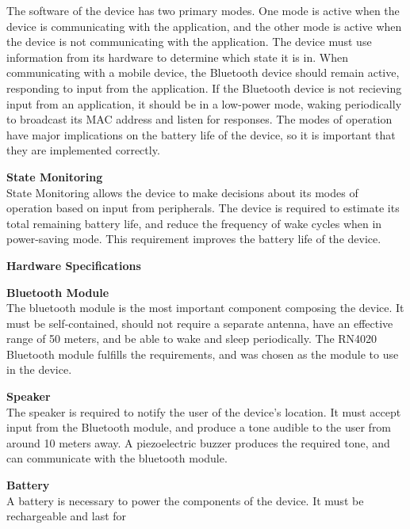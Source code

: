 \documentclass[12pt]{article}
\begin{document}
\begin{packed_enum}
\begin{packed_enum}
\begin{packed_enum}
        The software of the device has two primary modes. One mode is active when the device is communicating 
        with the application, and the other mode is active when the device is not communicating with the
        application. The device must use information from its hardware to determine which state it is in. When
        communicating with a mobile device, the Bluetooth device should remain active, responding to input from
        the application. If the Bluetooth device is not recieving input from an application, it should be in a 
        low-power mode, waking periodically to broadcast its MAC address and listen for responses. The modes of
        operation have major implications on the battery life of the device, so it is important that they are
        implemented correctly.
        \item \textbf{State Monitoring} \\
        State Monitoring allows the device to make decisions about its modes of operation based on input from
        peripherals. The device is required to estimate its total remaining battery life, and reduce the
        frequency of wake cycles when in power-saving mode. This requirement improves the battery life of the
        device.
      \end{packed_enum}
      \item \textbf{Hardware Specifications}
      \begin{packed_enum}
        \item \textbf{Bluetooth Module} \\
        The bluetooth module is the most important component composing the device. It must be self-contained,
        should not require a separate antenna, have an effective range of 50 meters, and be able to wake and 
        sleep periodically. The RN4020 Bluetooth module fulfills the requirements, and was chosen as the module
        to use in the device.
        \item \textbf{Speaker} \\
        The speaker is required to notify the user of the device's location. It must accept input from the
        Bluetooth module, and produce a tone audible to the user from around 10 meters away. A piezoelectric
        buzzer produces the required tone, and can communicate with the bluetooth module.
        \item \textbf{Battery} \\
        A battery is necessary to power the components of the device. It must be rechargeable and last for

\end{packed_enum}
\end{packed_enum}
\end{packed_enum}
\end{document}
